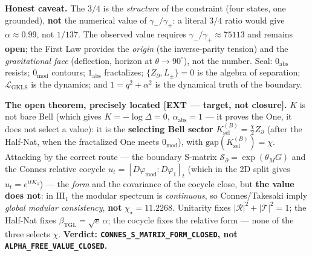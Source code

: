 \documentclass[11pt]{article}
\newcommand{\bTGL}{\beta_{\mathrm{TGL}}}\newcommand{\Msun}{M_{\odot}}\newcommand{\TGL}{\mathrm{TGL}}
\theoremstyle{definition}\newtheorem{deriv}{Derivation}
\begin{document}
\textbf{Honest caveat.} The $3/4$ is the \emph{structure} of the constraint (four states, one grounded), \textbf{not} the numerical value of $\gamma_-/\gamma_+$: a literal $3/4$ ratio would give $\alpha\approx0.99$, not $1/137$. The observed value requires $\gamma_-/\gamma_+\approx75113$ and remains \textbf{open}; the First Law provides the \emph{origin} (the inverse-parity tension) and the \emph{gravitational face} (deflection, horizon at $\theta\to90^\circ$), not the number. Seal: $0_{\mathrm{abs}}$ resists; $0_{\mathrm{mod}}$ contours; $1_{\mathrm{abs}}$ fractalizes; $\{Z_\partial,L_\pm\}=0$ is the algebra of separation; $\mathcal L_{\mathrm{GKLS}}$ is the dynamics; and $1=q^2+\alpha^2$ is the dynamical truth of the boundary.

\textbf{The open theorem, precisely located \textsf{[EXT --- target, not closure]}.} $K$ is not bare Bell (which gives $K=-\log\Delta=0$, $\alpha_{\mathrm{abs}}=1$ --- it proves the One, it does not select a value): it is the \textbf{selecting Bell sector} $K_{\mathrm{sel}}^{(B)}=\tfrac\chi2 Z_\partial$ (after the Half-Nat, when the fractalized One meets $0_{\mathrm{mod}}$), with $\mathrm{gap}(K_{\mathrm{sel}}^{(B)})=\chi$. Attacking by the correct route --- the boundary S-matrix $\mathcal{S}_\partial=\exp(\theta_M G)$ and the Connes relative cocycle $u_t=[D\varphi_{\mathrm{mod}}:D\varphi_1]_t$ (which in the 2D split gives $u_t=e^{itK_\partial}$) --- the \emph{form} and the covariance of the cocycle close, but \textbf{the value does not}: in $\mathrm{III}_1$ the modular spectrum is \emph{continuous}, so Connes/Takesaki imply \emph{global modular consistency}, \textbf{not} $\chi_\star=11.2268$. Unitarity fixes $|\mathcal R|^2+|\mathcal T|^2=1$; the Half-Nat fixes $\bTGL=\sqrt e\,\alpha$; the cocycle fixes the relative form --- none of the three selects $\chi$. \textbf{Verdict: \texttt{CONNES\_S\_MATRIX\_FORM\_CLOSED}, not \texttt{ALPHA\_FREE\_VALUE\_CLOSED}.}
\end{document}
